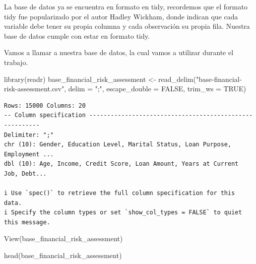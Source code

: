 \documentclass[
  letterpaper,
  DIV=11,
  numbers=noendperiod]{scrreprt}
\newenvironment{Shaded}{\begin{snugshade}}{\end{snugshade}}
\newcommand{\AttributeTok}[1]{\textcolor[rgb]{0.40,0.45,0.13}{#1}}
\newcommand{\ConstantTok}[1]{\textcolor[rgb]{0.56,0.35,0.01}{#1}}
\newcommand{\FunctionTok}[1]{\textcolor[rgb]{0.28,0.35,0.67}{#1}}
\newcommand{\NormalTok}[1]{\textcolor[rgb]{0.00,0.23,0.31}{#1}}
\newcommand{\OtherTok}[1]{\textcolor[rgb]{0.00,0.23,0.31}{#1}}
\newcommand{\StringTok}[1]{\textcolor[rgb]{0.13,0.47,0.30}{#1}}
\begin{document}
La base de datos ya se encuentra en formato en tidy, recordemos que el
formato tidy fue popularizado por el autor Hadley Wickham, donde indican
que cada variable debe tener su propia columna y cada observación su
propia fila. Nuestra base de datos cumple con estar en formato tidy.

Vamos a llamar a nuestra base de datos, la cual vamos a utilizar durante
el trabajo.

\begin{Shaded}
\begin{Highlighting}[]
\FunctionTok{library}\NormalTok{(readr)}
\NormalTok{base\_financial\_risk\_assessment }\OtherTok{\textless{}{-}} \FunctionTok{read\_delim}\NormalTok{(}\StringTok{"base{-}financial{-}risk{-}assessment.csv"}\NormalTok{, }
    \AttributeTok{delim =} \StringTok{";"}\NormalTok{, }\AttributeTok{escape\_double =} \ConstantTok{FALSE}\NormalTok{, }\AttributeTok{trim\_ws =} \ConstantTok{TRUE}\NormalTok{)}
\end{Highlighting}
\end{Shaded}

\begin{verbatim}
Rows: 15000 Columns: 20
-- Column specification --------------------------------------------------------
Delimiter: ";"
chr (10): Gender, Education Level, Marital Status, Loan Purpose, Employment ...
dbl (10): Age, Income, Credit Score, Loan Amount, Years at Current Job, Debt...

i Use `spec()` to retrieve the full column specification for this data.
i Specify the column types or set `show_col_types = FALSE` to quiet this message.
\end{verbatim}

\begin{Shaded}
\begin{Highlighting}[]
\FunctionTok{View}\NormalTok{(base\_financial\_risk\_assessment)}
\end{Highlighting}
\end{Shaded}

\begin{Shaded}
\begin{Highlighting}[]
\FunctionTok{head}\NormalTok{(base\_financial\_risk\_assessment)}
\end{Highlighting}
\end{Shaded}
\end{document}
